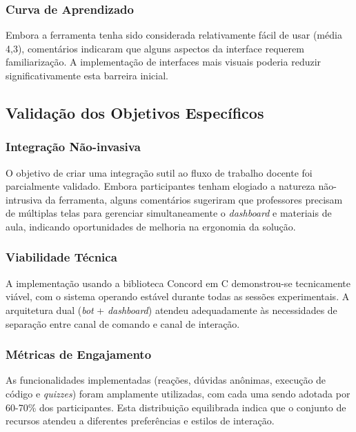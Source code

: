 \subsubsection{Curva de Aprendizado}

Embora a ferramenta tenha sido considerada relativamente fácil de usar (média
4,3), comentários indicaram que alguns aspectos da interface requerem
familiarização. A implementação de interfaces mais visuais poderia reduzir
significativamente esta barreira inicial.

\subsection{Validação dos Objetivos Específicos}

\subsubsection{Integração Não-invasiva}

O objetivo de criar uma integração sutil ao fluxo de trabalho docente foi
parcialmente validado. Embora participantes tenham elogiado a natureza
não-intrusiva da ferramenta, alguns comentários sugeriram que professores
precisam de múltiplas telas para gerenciar simultaneamente o \textit{dashboard}
e materiais de aula, indicando oportunidades de melhoria na ergonomia da
solução.

\subsubsection{Viabilidade Técnica}

A implementação usando a biblioteca Concord em C demonstrou-se tecnicamente
viável, com o sistema operando estável durante todas as sessões experimentais.
A arquitetura dual (\textit{bot} + \textit{dashboard}) atendeu adequadamente às
necessidades de separação entre canal de comando e canal de interação.

\subsubsection{Métricas de Engajamento}

As funcionalidades implementadas (reações, dúvidas anônimas, execução de código
e \textit{quizzes}) foram amplamente utilizadas, com cada uma sendo adotada por
60-70\% dos participantes. Esta distribuição equilibrada indica que o conjunto
de recursos atendeu a diferentes preferências e estilos de interação.

